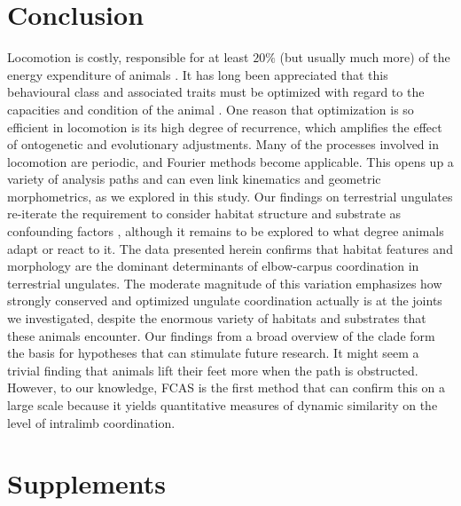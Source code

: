 \FloatBarrier\clearpage
\section{Conclusion}
Locomotion is costly, responsible for at least $20\%$ (but usually much more) of the energy expenditure of animals \citep{Rezende2009,Girard2001}.
It has long been appreciated that this behavioural class and associated traits must be optimized with regard to the capacities and condition of the animal \citep{Hoyt1981,Reilly2007}.
One reason that optimization is so efficient in locomotion is its high degree of recurrence, which amplifies the effect of ontogenetic and evolutionary adjustments.
Many of the processes involved in locomotion are periodic, and Fourier methods become applicable.
This opens up a variety of analysis paths and can even link kinematics and geometric morphometrics, as we explored in this study.
Our findings on terrestrial ungulates re-iterate the requirement to consider habitat structure and substrate as confounding factors \citep[\textit{cf.}][]{Johnson2002,Lejeune1998,Shepard2013}, although it remains to be explored to what degree animals adapt or react to it.
The data presented herein confirms that habitat features and morphology are the dominant determinants of elbow-carpus coordination in terrestrial ungulates.
The moderate magnitude of this variation emphasizes how strongly conserved and optimized ungulate coordination actually is at the joints we investigated, despite the enormous variety of habitats and substrates that these animals encounter.
Our findings from a broad overview of the clade form the basis for hypotheses that can stimulate future research.
It might seem a trivial finding that animals lift their feet more when the path is obstructed.
However, to our knowledge, FCAS is the first method that can confirm this on a large scale because it yields quantitative measures of dynamic similarity on the level of intralimb coordination.


\FloatBarrier\clearpage

\section{Supplements}
